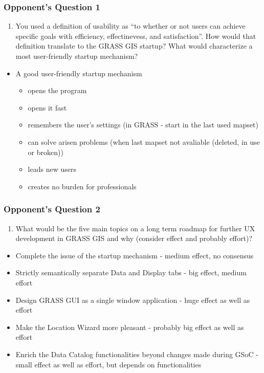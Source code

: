 \documentclass[aspectratio=169]{beamer}
\begin{document}
\begin{frame}
\frametitle{Opponent's Question 1}
\begin{enumerate}
\item{You used a definition of usability as ``to whether or not users can achieve specific goals with efficiency, effectinevess, and satisfaction''. How would that definition translate to the GRASS GIS startup? What would characterize a most user-friendly startup mechanism?}
\end{enumerate}
\begin{itemize}
\vspace{0.3cm}
\item{A good user-friendly startup mechanism}
\begin{itemize}
\item{opens the program}
\item{opens it fast}
\item{remembers the user's settings (in GRASS - start in the last used mapset)}
\item{can solve arisen problems (when last mapset not avaliable (deleted, in use or broken))}
\item{leads new users}
\item{creates no burden for professionals}
\end{itemize}
\end{itemize}
\end{frame}

\begin{frame}
\frametitle{Opponent's Question 2}
\begin{enumerate}\addtocounter{enumi}{1}
\item{What would be the five main topics on a long term roadmap for further UX development in GRASS GIS and why (consider effect and probably effort)?}
\end{enumerate}
\begin{itemize}
\vspace{0.3cm}
\item{Complete the issue of the startup mechanism} - medium effect, no consensus
\item{Strictly semantically separate Data and Display tabs} - big effect, medium effort
\item{Design GRASS GUI as a single window application} - huge effect as well as effort
\item{Make the Location Wizard more pleasant} - probably big effect as well as effort
\item{Enrich the Data Catalog functionalities beyond changes made during GSoC} - small effect as well as effort, but depends on functionalities
\end{itemize}
\end{frame}
\end{document}
